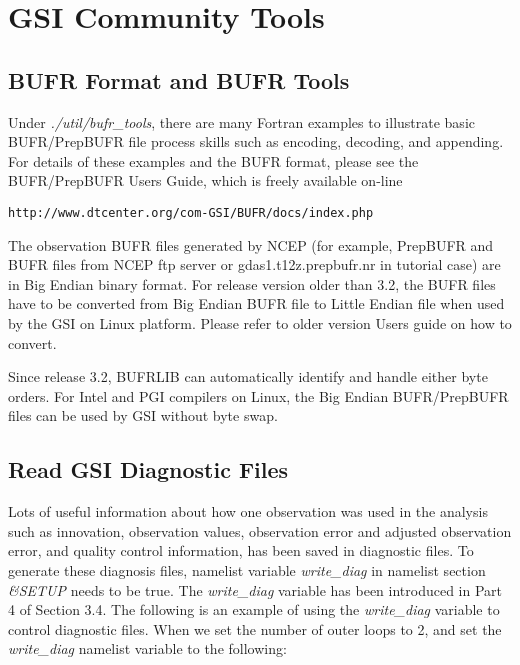 \chapter{GSI Community Tools}\label{gsi_tool}
 
\section{BUFR Format and BUFR Tools}

Under \textit{./util/bufr\_tools}, there are many Fortran examples to illustrate basic BUFR/PrepBUFR file process skills such as encoding, decoding, and appending. For details of these examples and the BUFR format, please see the BUFR/PrepBUFR User\textquotesingle s Guide, which is freely available on-line
\begin{scriptsize}
\begin{verbatim}
http://www.dtcenter.org/com-GSI/BUFR/docs/index.php
\end{verbatim}
\end{scriptsize}
The observation BUFR files generated by NCEP (for example, PrepBUFR and BUFR files from NCEP ftp server or gdas1.t12z.prepbufr.nr in tutorial case) are in Big Endian binary format. For release version older than 3.2, the BUFR files have to be converted from  Big Endian BUFR file to Little Endian file when used by the GSI on Linux platform. Please refer to older version User\textquotesingle s guide on how to convert.

Since release 3.2, BUFRLIB can automatically identify and handle either byte orders. For Intel and PGI compilers on Linux, the Big Endian BUFR/PrepBUFR files can be used by GSI without byte swap.

\section{Read GSI Diagnostic Files}

Lots of useful information about how one observation was used in the analysis such as innovation, observation values, observation error and adjusted observation error, and quality control information, has been saved in diagnostic files. To generate these diagnosis files, namelist variable \textit{write\_diag} in namelist section \textit{\&SETUP} needs to be true. The \textit{write\_diag} variable has been introduced in Part 4 of Section 3.4. The following is an example of using the \textit{write\_diag} variable to control diagnostic files. When we set the number of outer loops to 2, and set the \textit{write\_diag} namelist variable to the following:

